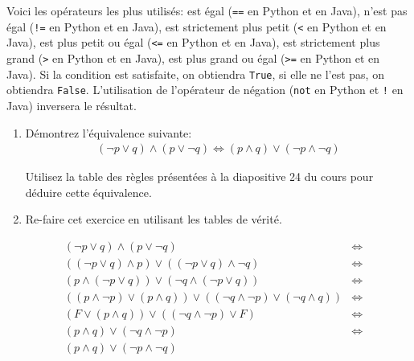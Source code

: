 Voici les opérateurs les plus utilisés: est égal (\lstinline{==} en Python et en Java), n'est pas égal (\lstinline{!=} en Python et en Java), est strictement plus petit (\lstinline{<} en Python et en Java), est plus petit ou égal (\lstinline{<=} en Python et en Java), est strictement plus grand (\lstinline{>} en Python et en Java), est plus grand ou égal (\lstinline{>=} en Python et en Java).
Si la condition est satisfaite, on obtiendra \lstinline{True}, si elle ne l'est pas, on obtiendra \lstinline{False}.
L'utilisation de l'opérateur de négation (\lstinline{not} en Python et \lstinline{!} en Java) inversera le résultat.\\

\begin{Exercice}[7 minutes]
\begin{enumerate}
    \item 
 Démontrez l'équivalence suivante:
\begin{align*}
   (\neg p \vee q) \wedge (p \vee \neg q) \Leftrightarrow (p \wedge q) \vee (\neg p \wedge \neg q)
\end{align*}
\begin{conseil}
	Utilisez la table des règles présentées à la diapositive 24 du cours pour déduire cette équivalence. 
\end{conseil}
\item Re-faire cet exercice en utilisant les tables de vérité.
\end{enumerate}
\begin{solution}
   \begin{align*}
   & (\neg p \vee q) \wedge (p \vee \neg q) &\Leftrightarrow   \\
   & ((\neg p \vee q) \wedge p) \vee  ((\neg p \vee q) \wedge \neg q) &\Leftrightarrow  \tag{Distribution} \\
   & (p\wedge (\neg p \vee q)) \vee  ( \neg q \wedge (\neg p \vee q) ) &\Leftrightarrow  \tag{Commutativity} \\
   & ((p\wedge \neg p) \vee (p\wedge q)) \vee  ( (\neg q \wedge \neg p) \vee (\neg q \wedge q) )  &\Leftrightarrow \tag{Distribution} \\ 
   & (F \vee (p\wedge q)) \vee  ( (\neg q \wedge \neg p) \vee F)  &\Leftrightarrow \tag{Negation} \\
   & (p\wedge q) \vee  (\neg q \wedge \neg p)  &\Leftrightarrow \tag{Bound} \\
      & (p\wedge q) \vee  (\neg p \wedge \neg q )   \tag{Commutativity} \\
\end{align*}

\end{solution}
\end{Exercice}
